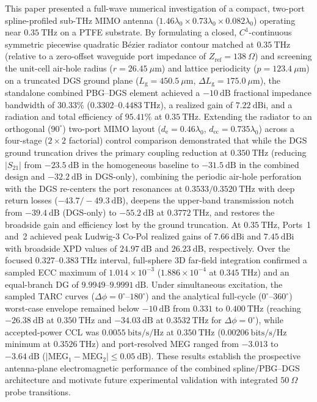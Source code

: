 \documentclass[referee,pdflatex,sn-mathphys-ay]{sn-jnl}
\begin{document}
This paper presented a full-wave numerical investigation of a compact, two-port spline-profiled sub-THz MIMO antenna (\(1.46\lambda_0 \times 0.73\lambda_0 \times 0.082\lambda_0\)) operating near \(0.35~\mathrm{THz}\) on a PTFE substrate. By formulating a closed, $C^{1}$-continuous symmetric piecewise quadratic B\'ezier radiator contour matched at \(0.35~\mathrm{THz}\) (relative to a zero-offset waveguide port impedance of $Z_{\mathrm{ref}} = 138~\Omega$) and screening the unit-cell air-hole radius (\(r = 26.45~\mu\mathrm{m}\)) and lattice periodicity (\(p = 123.4~\mu\mathrm{m}\)) on a truncated DGS ground plane ($L_{\mathrm{g}} = 450.5~\mu\mathrm{m}$, $\Delta L_{\mathrm{g}} = 175.0~\mu\mathrm{m}$), the standalone combined PBG--DGS element achieved a \(-10~\mathrm{dB}\) fractional impedance bandwidth of \(30.33\%\) (\(0.3302\)--\(0.4483~\mathrm{THz}\)), a realized gain of \(7.22~\mathrm{dBi}\), and a radiation and total efficiency of \(95.41\%\) at \(0.35~\mathrm{THz}\). Extending the radiator to an orthogonal ($90^{\circ}$) two-port MIMO layout ($d_{\mathrm{e}} = 0.46\lambda_0$, $d_{\mathrm{cc}} = 0.735\lambda_0$) across a four-stage ($2 \times 2$ factorial) control comparison demonstrated that while the DGS ground truncation drives the primary coupling reduction at $0.350~\mathrm{THz}$ (reducing $|S_{21}|$ from \(-23.5~\mathrm{dB}\) in the homogeneous baseline to \(-31.5~\mathrm{dB}\) in the combined design and \(-32.2~\mathrm{dB}\) in DGS-only), combining the periodic air-hole perforation with the DGS re-centers the port resonances at \(0.3533 / 0.3520~\mathrm{THz}\) with deep return losses (\(-43.7 / -49.3~\mathrm{dB}\)), deepens the upper-band transmission notch from \(-39.4~\mathrm{dB}\) (DGS-only) to \(-55.2~\mathrm{dB}\) at \(0.3772~\mathrm{THz}\), and restores the broadside gain and efficiency lost by the ground truncation. At \(0.35~\mathrm{THz}\), Ports~1 and~2 achieved peak Ludwig-3 Co-Pol realized gains of \(7.66~\mathrm{dBi}\) and \(7.45~\mathrm{dBi}\) with broadside XPD values of \(24.97~\mathrm{dB}\) and \(26.23~\mathrm{dB}\), respectively. Over the focused \(0.327\)--\(0.383~\mathrm{THz}\) interval, full-sphere 3D far-field integration confirmed a sampled ECC maximum of \(1.014\times10^{-3}\) ($1.886\times 10^{-4}$ at $0.345~\mathrm{THz}$) and an equal-branch DG of \(9.9949\)--\(9.9991~\mathrm{dB}\). Under simultaneous excitation, the sampled TARC curves ($\Delta\phi = 0^{\circ}$--$180^{\circ}$) and the analytical full-cycle ($0^{\circ}$--$360^{\circ}$) worst-case envelope remained below \(-10~\mathrm{dB}\) from \(0.331\) to \(0.400~\mathrm{THz}\) (reaching \(-26.38~\mathrm{dB}\) at \(0.350~\mathrm{THz}\) and \(-34.03~\mathrm{dB}\) at \(0.3532~\mathrm{THz}\) for $\Delta\phi = 0^{\circ}$), while accepted-power CCL was \(0.0055~\mathrm{bits/s/Hz}\) at \(0.350~\mathrm{THz}\) (\(0.00206~\mathrm{bits/s/Hz}\) minimum at \(0.3526~\mathrm{THz}\)) and port-resolved MEG ranged from \(-3.013\) to \(-3.64~\mathrm{dB}\) ($|\mathrm{MEG}_1 - \mathrm{MEG}_2| \le 0.05~\mathrm{dB}$). These results establish the prospective antenna-plane electromagnetic performance of the combined spline/PBG--DGS architecture and motivate future experimental validation with integrated $50~\Omega$ probe transitions.
\end{document}
